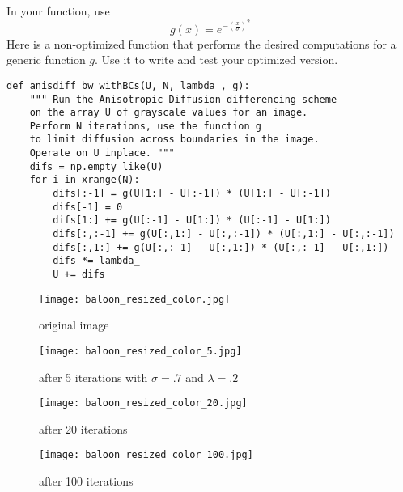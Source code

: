 \begin{problem}
In your function, use
\[g(x) = e^{-\left(\frac{x}{\sigma}\right)^2}\]
Here is a non-optimized function that performs the desired computations for a generic function $g$.
Use it to write and test your optimized version.
\begin{lstlisting}
def anisdiff_bw_withBCs(U, N, lambda_, g):
    """ Run the Anisotropic Diffusion differencing scheme
    on the array U of grayscale values for an image.
    Perform N iterations, use the function g
    to limit diffusion across boundaries in the image.
    Operate on U inplace. """
    difs = np.empty_like(U)
    for i in xrange(N):
        difs[:-1] = g(U[1:] - U[:-1]) * (U[1:] - U[:-1])
        difs[-1] = 0
        difs[1:] += g(U[:-1] - U[1:]) * (U[:-1] - U[1:])
        difs[:,:-1] += g(U[:,1:] - U[:,:-1]) * (U[:,1:] - U[:,:-1])
        difs[:,1:] += g(U[:,:-1] - U[:,1:]) * (U[:,:-1] - U[:,1:])
        difs *= lambda_
        U += difs
\end{lstlisting}
\end{problem}

\newpage
\vfill
\begin{figure}[ht]
\begin{minipage}[b]{0.45\linewidth}
\centering
\texttt{[image: baloon\_resized\_color.jpg]}
\caption*{original image}
\end{minipage}
\hspace{0.5cm}
\begin{minipage}[b]{0.45\linewidth}
\centering
\texttt{[image: baloon\_resized\_color\_5.jpg]}
\caption*{after 5 iterations with $\sigma = .7$ and $\lambda = .2$}
\end{minipage}
\begin{minipage}[b]{0.45\linewidth}
\centering
\texttt{[image: baloon\_resized\_color\_20.jpg]}
\caption*{after 20 iterations}
\end{minipage}
\hspace{0.5cm}
\begin{minipage}[b]{0.45\linewidth}
\centering
\texttt{[image: baloon\_resized\_color\_100.jpg]}
\caption*{after 100 iterations}
\end{minipage}
\end{figure}
\vfill
\clearpage

